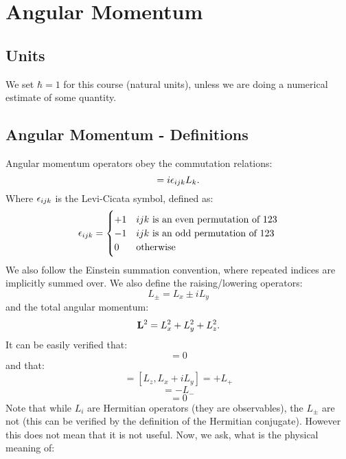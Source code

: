 \section{Angular Momentum}

\subsection{Units}
We set $\hbar = 1$ for this course (natural units), unless we are doing a numerical estimate of some quantity.

\subsection{Angular Momentum - Definitions}
Angular momentum operators obey the commutation relations:
\begin{equation}
    [L_i, L_j] = i\e_{ijk}L_k.
\end{equation}
Where $\epsilon_{ijk}$ is the Levi-Cicata symbol, defined as:
\begin{equation}
    \epsilon_{ijk} = \begin{cases}
        +1 & ijk \text{ is an even permutation of 123}
        \\ -1 & ijk \text{ is an odd permutation of 123}
        \\ 0 & \text{otherwise}
    \end{cases}
\end{equation}
We also follow the Einstein summation convention, where repeated indices are implicitly summed over. We also define the raising/lowering operators:
\begin{equation}
    L_{\pm} = L_x \pm iL_y
\end{equation}
and the total angular momentum:
\begin{equation}\label{eq-Lsquared}
    \mathbf{L}^2 = L_x^2 + L_y^2 + L_z^2.
\end{equation}
It can be easily verified that:
\begin{equation}
    [\v{L}^2, L_i] = 0
\end{equation}
and that:
\begin{equation}
    [L_z, L_+] = [L_z, L_x + iL_y] = +L_+
\end{equation}
\begin{equation}
    [L_z, L_-] = -L_-
\end{equation}
\begin{equation}
    [\v{L}^2, L_\pm] = 0
\end{equation}
Note that while $L_i$ are Hermitian operators (they are observables), the $L_\pm$ are not (this can be verified by the definition of the Hermitian conjugate). However this does not mean that it is not useful. Now, we ask, what is the physical meaning of:
